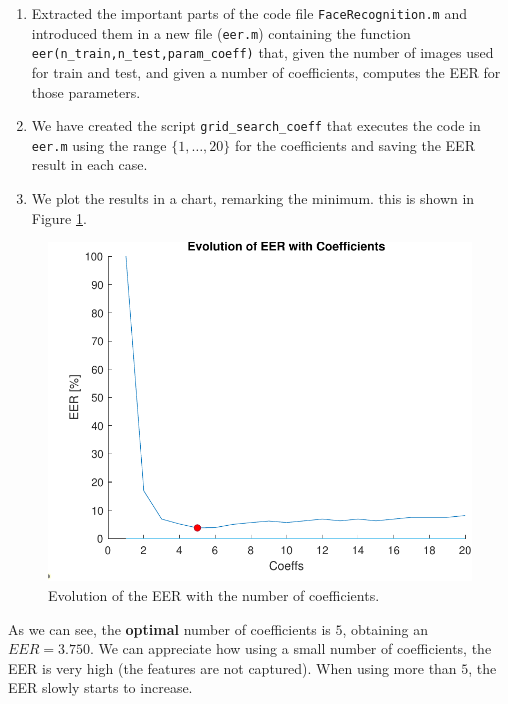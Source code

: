 \documentclass[a4paper]{article}
\def\inline{\lstinline[basicstyle=\ttfamily,keywordstyle={}]}
\begin{document}
\begin{enumerate}

\item Extracted the important parts of the code file \inline{FaceRecognition.m} and introduced them in a new file (\inline{eer.m}) containing the function \inline{eer(n_train,n_test,param_coeff)} that, given the number of images used for train and test, and given a number of coefficients, computes the EER for those parameters.
  
\item We have created the script \inline{grid_search_coeff} that executes the code in \inline{eer.m} using the range \(\{1,\dots,20\}\) for the coefficients and saving the EER result in each case.

\item We plot the results in a chart, remarking the minimum. this is shown in Figure \ref{fig:ex1c}.
\end{enumerate}

\begin{figure}[H]
  \centering
  \includegraphics[scale=0.5]{Figures/EERvsCOEFF}
    \caption{Evolution of the EER with the number of coefficients.}
    \label{fig:ex1c}
\end{figure}


As we can see, the \textbf{optimal} number of coefficients is \(5\), obtaining an \(EER = 3.750\). We can appreciate how using a small number of coefficients, the EER is very high (the features are not captured). When using more than \(5\), the EER slowly starts to increase.
\end{document}
